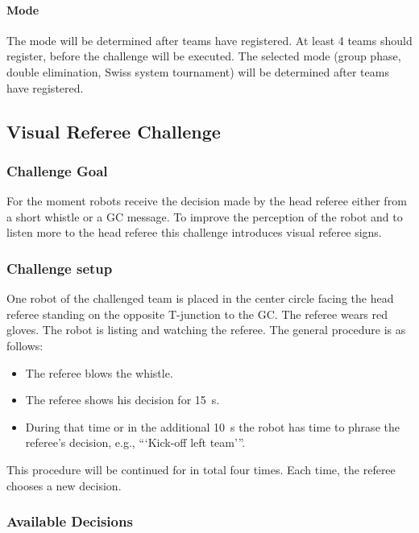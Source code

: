         \paragraph{Mode}
            The mode will be determined after teams have registered. At least 4 teams should register, before the challenge will be executed. The selected mode (group phase, double elimination, Swiss system tournament) will be determined after teams have registered. 

\subsection{Visual Referee Challenge}

    \subsubsection{Challenge Goal}

        For the moment robots receive the decision made by the head referee either from a short whistle or a GC message. To improve the perception of the robot and to listen more to the head referee this challenge introduces visual referee signs.

    \subsubsection{Challenge setup}

        One robot of the challenged team is placed in the center circle facing the head referee standing on the opposite T-junction to the GC. The referee wears red gloves. The robot is listing and watching the referee. The general procedure is as follows:

        \begin{itemize}
            \item The referee blows the whistle.
            \item The referee shows his decision for \qty{15}{\second}.
            \item During that time or in the additional \qty{10}{\second} the robot has time to phrase the referee's decision, e.g., ```Kick-off left team'''. 
        \end{itemize}

        This procedure will be continued for in total four times. Each time, the referee chooses a new decision.

    \subsubsection{Available Decisions}

